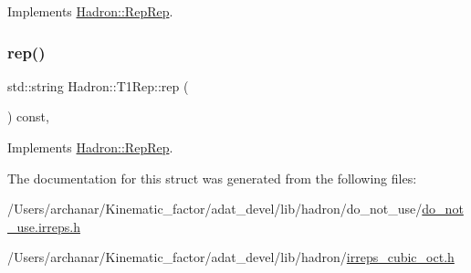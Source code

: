 Implements \mbox{\hyperlink{structHadron_1_1RepRep_ab3213025f6de249f7095892109575fde}{Hadron\+::\+Rep\+Rep}}.

\mbox{\label{structHadron_1_1T1Rep_ad64cbc6c40d059a9cee94bab5f8614ce}} 
\subsubsection{\texorpdfstring{rep()}{rep()}\hspace{0.1cm}{\footnotesize\ttfamily [3/3]}}
{\footnotesize\ttfamily std\+::string Hadron\+::\+T1\+Rep\+::rep (\begin{DoxyParamCaption}{ }\end{DoxyParamCaption}) const\hspace{0.3cm}{\ttfamily [inline]}, {\ttfamily [virtual]}}



Implements \mbox{\hyperlink{structHadron_1_1RepRep_ab3213025f6de249f7095892109575fde}{Hadron\+::\+Rep\+Rep}}.



The documentation for this struct was generated from the following files\+:\begin{DoxyCompactItemize}
\item 
/\+Users/archanar/\+Kinematic\+\_\+factor/adat\+\_\+devel/lib/hadron/do\+\_\+not\+\_\+use/\mbox{\hyperlink{do__not__use_8irreps_8h}{do\+\_\+not\+\_\+use.\+irreps.\+h}}\item 
/\+Users/archanar/\+Kinematic\+\_\+factor/adat\+\_\+devel/lib/hadron/\mbox{\hyperlink{lib_2hadron_2irreps__cubic__oct_8h}{irreps\+\_\+cubic\+\_\+oct.\+h}}\end{DoxyCompactItemize}
